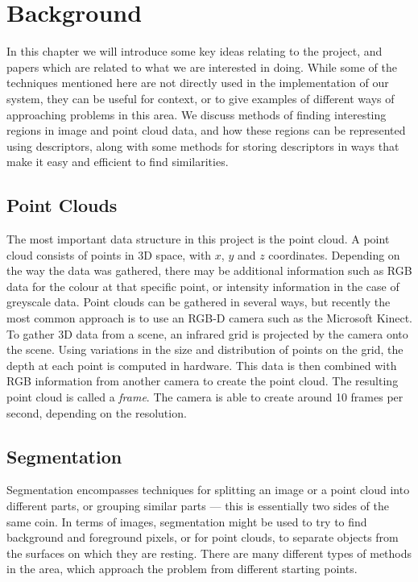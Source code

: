 \documentclass[11pt,a4paper]{kth-mag}
\begin{document}
\chapter{Background}
\label{chap:bg}
In this chapter we will introduce some key ideas relating to the project, and
papers which are related to what we are interested in doing. While some of the
techniques mentioned here are not directly used in the implementation of our
system, they can be useful for context, or to give examples of different ways of
approaching problems in this area. We discuss methods of finding interesting
regions in image and point cloud data, and how these regions can be represented
using descriptors, along with some methods for storing descriptors in ways that
make it easy and efficient to find similarities.

\section{Point Clouds}
The most important data structure in this project is the point cloud. A point
cloud consists of points in 3D space, with $x$, $y$ and $z$ coordinates.
Depending on the way the data was gathered, there may be additional information
such as RGB data for the colour at that specific point, or intensity information
in the case of greyscale data. Point clouds can be gathered in several ways, but
recently the most common approach is to use an RGB-D camera such as the
Microsoft Kinect. To gather 3D data from a scene, an infrared grid is projected
by the camera onto the scene. Using variations in the size and distribution of
points on the grid, the depth at each point is computed in hardware. This data
is then combined with RGB information from another camera to create the point
cloud. The resulting point cloud is called a \emph{frame}. The camera is able to
create around 10 frames per second, depending on the resolution.

\section{Segmentation}
Segmentation encompasses techniques for splitting an image or a point cloud into
different parts, or grouping similar parts --- this is essentially two sides of
the same coin. In terms of images, segmentation might be used to try to find
background and foreground pixels, or for point clouds, to separate objects from
the surfaces on which they are resting. There are many different types of
methods in the area, which approach the problem from different starting points.
\end{document}
